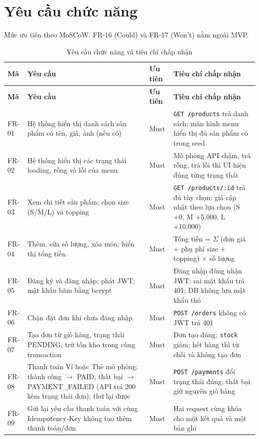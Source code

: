 \section{Yêu cầu chức năng}\label{sec:se-fr}
Mức ưu tiên theo MoSCoW. FR-16 (Could) và FR-17 (Won't) nằm ngoài MVP.
{\small
\begin{longtable}{@{}p{1.2cm}p{5.4cm}p{1.2cm}p{6.6cm}@{}}
\caption{Yêu cầu chức năng và tiêu chí chấp nhận}\label{tab:fr}\\
\toprule \textbf{Mã} & \textbf{Yêu cầu} & \textbf{Ưu tiên} & \textbf{Tiêu chí chấp nhận} \\ \midrule \endfirsthead
\toprule \textbf{Mã} & \textbf{Yêu cầu} & \textbf{Ưu tiên} & \textbf{Tiêu chí chấp nhận} \\ \midrule \endhead
\bottomrule \endlastfoot
FR-01 & Hệ thống hiển thị danh sách sản phẩm có tên, giá, ảnh (nếu có) & Must & \texttt{GET /\allowbreak{}products} trả danh sách; màn hình menu hiển thị đủ sản phẩm có trong seed \\
FR-02 & Hệ thống hiển thị các trạng thái loading, rỗng và lỗi của menu & Must & Mô phỏng API chậm, trả rỗng, trả lỗi thì UI hiện đúng từng trạng thái \\
FR-03 & Xem chi tiết sản phẩm; chọn size (S/M/L) và topping & Must & \texttt{GET /\allowbreak{}products/\allowbreak{}:id} trả đủ tùy chọn; giá cập nhật theo lựa chọn (S +0, M +5.000, L +10.000) \\
FR-04 & Thêm, sửa số lượng, xóa món; hiển thị tổng tiền & Must & Tổng tiền = $\Sigma$ (đơn giá + phụ phí size + topping) $\times$ số lượng \\
FR-05 & Đăng ký và đăng nhập; phát JWT; mật khẩu băm bằng bcrypt & Must & Đăng nhập đúng nhận JWT; sai mật khẩu trả 401; DB không lưu mật khẩu thô \\
FR-06 & Chặn đặt đơn khi chưa đăng nhập & Must & \texttt{POST /\allowbreak{}orders} không có JWT trả 401 \\
FR-07 & Tạo đơn từ giỏ hàng, trạng thái PENDING, trừ tồn kho trong cùng transaction & Must & Đơn tạo đúng; \texttt{stock} giảm; hết hàng thì từ chối và không tạo đơn \\
FR-08 & Thanh toán Ví hoặc Thẻ mô phỏng; thành công $\to$ PAID, thất bại $\to$ PAYMENT\_FAILED (API trả 200 kèm trạng thái đơn); thử lại được & Must & \texttt{POST /\allowbreak{}payments} đổi trạng thái đúng; thất bại giữ nguyên giỏ hàng \\
FR-09 & Gửi lại yêu cầu thanh toán với cùng Idempotency-Key không tạo thêm thanh toán/đơn & Must & Hai request cùng khóa cho một kết quả và một bản ghi \\

\end{longtable}}
